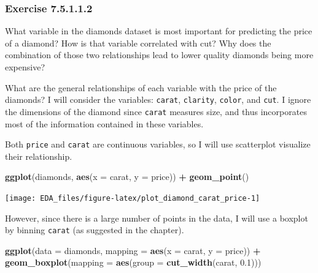 \documentclass[]{book}
\newenvironment{Shaded}{\begin{snugshade}}{\end{snugshade}}
\newcommand{\DataTypeTok}[1]{\textcolor[rgb]{0.13,0.29,0.53}{#1}}
\newcommand{\FloatTok}[1]{\textcolor[rgb]{0.00,0.00,0.81}{#1}}
\newcommand{\KeywordTok}[1]{\textcolor[rgb]{0.13,0.29,0.53}{\textbf{#1}}}
\newcommand{\NormalTok}[1]{#1}
\newcommand{\OperatorTok}[1]{\textcolor[rgb]{0.81,0.36,0.00}{\textbf{#1}}}
\newcommand{\StringTok}[1]{\textcolor[rgb]{0.31,0.60,0.02}{#1}}
\theoremstyle{plain}
\theoremstyle{remark}
\begin{document}
\hypertarget{exercise-7.5.1.1.2}{%
\subsubsection*{\texorpdfstring{Exercise {7.5.1.1.2}}{Exercise 7.5.1.1.2}}\label{exercise-7.5.1.1.2}}

What variable in the diamonds dataset is most important for predicting the price of a diamond?
How is that variable correlated with cut?
Why does the combination of those two relationships lead to lower quality diamonds being more expensive?

What are the general relationships of each variable with the price of the diamonds?
I will consider the variables: \texttt{carat}, \texttt{clarity}, \texttt{color}, and \texttt{cut}.
I ignore the dimensions of the diamond since \texttt{carat} measures size, and thus incorporates most of the information contained in these variables.

Both \texttt{price} and \texttt{carat} are continuous variables, so I will use scatterplot visualize their relationship.

\begin{Shaded}
\begin{Highlighting}[]
\KeywordTok{ggplot}\NormalTok{(diamonds, }\KeywordTok{aes}\NormalTok{(}\DataTypeTok{x =}\NormalTok{ carat, }\DataTypeTok{y =}\NormalTok{ price)) }\OperatorTok{+}
\StringTok{  }\KeywordTok{geom_point}\NormalTok{()}
\end{Highlighting}
\end{Shaded}

\begin{center}\texttt{[image: EDA\_files/figure-latex/plot\_diamond\_carat\_price-1]} \end{center}

However, since there is a large number of points in the data, I will use a boxplot by binning \texttt{carat} (as suggested in the chapter).

\begin{Shaded}
\begin{Highlighting}[]
\KeywordTok{ggplot}\NormalTok{(}\DataTypeTok{data =}\NormalTok{ diamonds, }\DataTypeTok{mapping =} \KeywordTok{aes}\NormalTok{(}\DataTypeTok{x =}\NormalTok{ carat, }\DataTypeTok{y =}\NormalTok{ price)) }\OperatorTok{+}
\StringTok{  }\KeywordTok{geom_boxplot}\NormalTok{(}\DataTypeTok{mapping =} \KeywordTok{aes}\NormalTok{(}\DataTypeTok{group =} \KeywordTok{cut_width}\NormalTok{(carat, }\FloatTok{0.1}\NormalTok{)))}
\end{Highlighting}
\end{Shaded}
\end{document}
